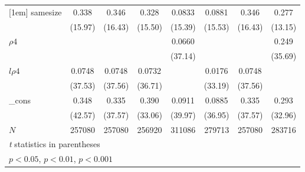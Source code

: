 {\begin{tabular}{l*{7}{c}}
[1em]
samesize    &       0.338\sym{***}&       0.346\sym{***}&       0.328\sym{***}&      0.0833\sym{***}&      0.0881\sym{***}&       0.346\sym{***}&       0.277\sym{***}\\
            &     (15.97)         &     (16.43)         &     (15.50)         &     (15.39)         &     (15.53)         &     (16.43)         &     (13.15)         \\
[1em]
$ \rho4 $         &                     &                     &                     &      0.0660\sym{***}&                     &                     &       0.249\sym{***}\\
            &                     &                     &                     &     (37.14)         &                     &                     &     (35.69)         \\
    [1em]
$ l\rho4 $         &      0.0748\sym{***}&      0.0748\sym{***}&      0.0732\sym{***}&                     &      0.0176\sym{***}&      0.0748\sym{***}&                     \\
            &     (37.53)         &     (37.56)         &     (36.71)         &                     &     (33.19)         &     (37.56)         &                     \\            
[1em]
\_cons      &       0.348\sym{***}&       0.335\sym{***}&       0.390\sym{***}&      0.0911\sym{***}&      0.0885\sym{***}&       0.335\sym{***}&       0.293\sym{***}\\
            &     (42.57)         &     (37.57)         &     (33.06)         &     (39.97)         &     (36.95)         &     (37.57)         &     (32.96)         \\
\hline
\(N\)       &      257080         &      257080         &      256920         &      311086         &      279713         &      257080         &      283716         \\
\hline\hline
\multicolumn{8}{l}{\footnotesize \textit{t} statistics in parentheses}\\
\multicolumn{8}{l}{\footnotesize \sym{*} \(p<0.05\), \sym{**} \(p<0.01\), \sym{***} \(p<0.001\)}\\
\end{tabular}
}
